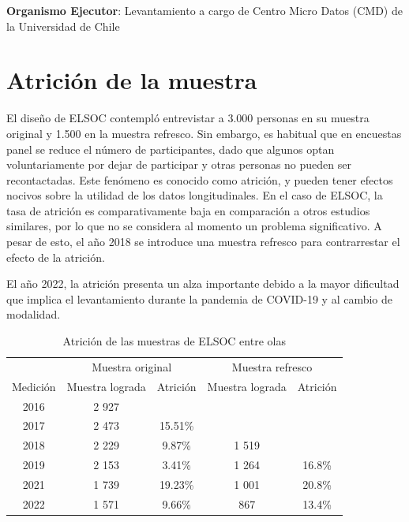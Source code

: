 \documentclass[
  12pt,
]{book}
\begin{document}
\textbf{Organismo Ejecutor}: Levantamiento a cargo de Centro Micro Datos (CMD) de la Universidad de Chile

\hypertarget{atriciuxf3n-de-la-muestra}{%
\section{Atrición de la muestra}\label{atriciuxf3n-de-la-muestra}}

El diseño de ELSOC contempló entrevistar a 3.000 personas en su muestra original y 1.500 en la muestra refresco. Sin embargo, es habitual que en encuestas panel se reduce el número de participantes, dado que algunos optan voluntariamente por dejar de participar y otras personas no pueden ser recontactadas. Este fenómeno es conocido como atrición, y pueden tener efectos nocivos sobre la utilidad de los datos longitudinales. En el caso de ELSOC, la tasa de atrición es comparativamente baja en comparación a otros estudios similares, por lo que no se considera al momento un problema significativo. A pesar de esto, el año 2018 se introduce una muestra refresco para contrarrestar el efecto de la atrición.

El año 2022, la atrición presenta un alza importante debido a la mayor dificultad que implica el levantamiento durante la pandemia de COVID-19 y al cambio de modalidad.

\begin{table}

\caption{\label{tab:tabla-atricion}Atrición de las muestras de ELSOC entre olas}
\centering
\begin{tabular}[t]{c|c|c|c|c}
\hline
\multicolumn{1}{c|}{ } & \multicolumn{2}{c|}{Muestra original} & \multicolumn{2}{c}{Muestra refresco} \\
\cline{2-3} \cline{4-5}
Medición & Muestra lograda & Atrición & Muestra lograda & Atrición\\
\hline
2016 & 2 927 &  &  & \\
\hline
2017 & 2 473 & 15.51\% &  & \\
\hline
2018 & 2 229 & 9.87\% & 1 519 & \\
\hline
2019 & 2 153 & 3.41\% & 1 264 & 16.8\%\\
\hline
2021 & 1 739 & 19.23\% & 1 001 & 20.8\%\\
\hline
2022 & 1 571 & 9.66\% & 867 & 13.4\%\\
\hline
\end{tabular}
\end{table}
\end{document}
